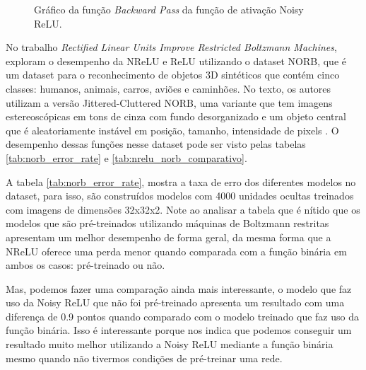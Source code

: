 \begin{figure}[htbp] %
    \centering %
    \caption{Gráfico da função \textit{Backward Pass} da função de ativação Noisy ReLU.}
    \label{fig:nrelu-derivada}
\end{figure}

No trabalho \textit{Rectified Linear Units Improve Restricted Boltzmann Machines}, \textcite{Nair2010} exploram o desempenho da NReLU e ReLU utilizando o dataset NORB, que é um dataset para o reconhecimento de objetos 3D sintéticos que contém cinco classes: humanos, animais, carros, aviões e caminhões. No texto, os autores utilizam a versão Jittered-Cluttered NORB, uma variante que tem imagens estereoscópicas em tons de cinza com fundo desorganizado e um objeto central que é aleatoriamente instável em posição, tamanho, intensidade de pixels \parencite{Nair2010}. O desempenho dessas funções nesse dataset pode ser visto pelas tabelas \ref{tab:norb_error_rate} e \ref{tab:nrelu_norb_comparativo}.

A tabela \ref{tab:norb_error_rate}, mostra a taxa de erro dos diferentes modelos no dataset, para isso, são construídos modelos com 4000 unidades ocultas treinados com imagens de dimensões 32x32x2. Note ao analisar a tabela que é nítido que os modelos que são pré-treinados utilizando máquinas de Boltzmann restritas apresentam um melhor desempenho de forma geral, da mesma forma que a NReLU oferece uma perda menor quando comparada com a função binária em ambos os casos: pré-treinado ou não. 

Mas, podemos fazer uma comparação ainda mais interessante, o modelo que faz uso da Noisy ReLU que não foi pré-treinado apresenta um resultado com uma diferença de 0.9 pontos quando comparado com o modelo treinado que faz uso da função binária. Isso é interessante porque nos indica que podemos conseguir um resultado muito melhor utilizando a Noisy ReLU mediante a função binária mesmo quando não tivermos condições de pré-treinar uma rede.

